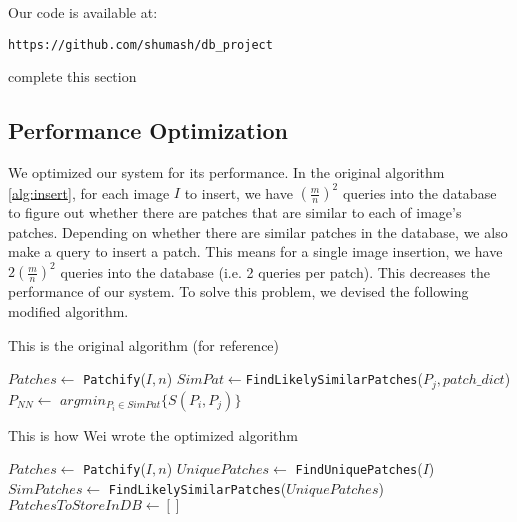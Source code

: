 Our code is available at:
\begin{verbatim}
https://github.com/shumash/db_project
\end{verbatim}

\begin{edit}
complete this section
\end{edit}

\subsection{Performance Optimization}

We optimized our system for its performance. In the original algorithm \ref{alg:insert}, for each image $I$ to insert, we have $\left(\frac{m}{n}\right)^2$ queries into the database to figure out whether there are patches that are similar to each of image's patches. Depending on whether there are similar patches in the database, we also make a query to insert a patch. This means for a single image insertion, we have $2\left(\frac{m}{n}\right)^2$ queries into the database (i.e. 2 queries per patch). This decreases the performance of our system. To solve this problem, we devised the following modified algorithm.

\begin{edit}
\begin{algorithm}
    \caption{This is the original algorithm (for reference)}
    \label{alg:insert}
\begin{algorithmic}[1]
\State $Patches \leftarrow $ \texttt{Patchify}($I,n$)
\State $SimPat \leftarrow $\texttt{FindLikelySimilarPatches}($P_j,patch\_dict$)
\State $P_{NN} \leftarrow $ $argmin_{P_i \in SimPat} \{ S(P_i, P_j) \}$
\EndIf
\EndFor
\vspace{3mm}
\end{algorithmic}
\label{insert_algorithm}
\end{algorithm}
\end{edit}

\begin{algorithm}
    \caption{This is how Wei wrote the optimized algorithm}
    \label{alg:insert}
\begin{algorithmic}[1]
\State $Patches \leftarrow $ \texttt{Patchify}($I, n$)
\State $UniquePatches \leftarrow$ \texttt{FindUniquePatches}($I$)
\State $SimPatches \leftarrow$ \texttt{FindLikelySimilarPatches}($UniquePatches$)
\State $PatchesToStoreInDB \leftarrow []$
\EndIf
\EndFor
{}
\vspace{3mm}
\end{algorithmic}
\label{opt_algorithm}
\end{algorithm}

